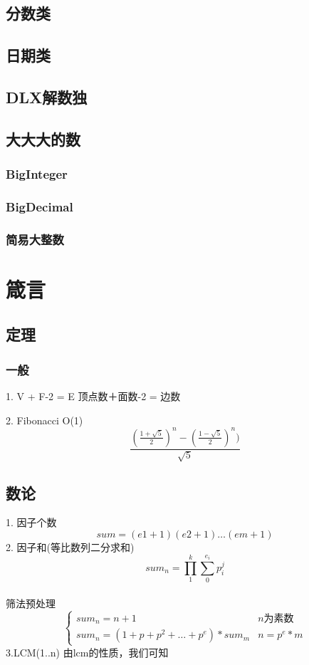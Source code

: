 \documentclass{article}
\begin{document}
\subsection{分数类}

\subsection{日期类}

\subsection{DLX解数独}

\subsection{大大大的数}
\subsubsection{BigInteger}

\subsubsection{BigDecimal}

\subsubsection{简易大整数}

\section{箴言}

\subsection{定理}
\subsubsection{一般}
1. V + F-2 = E 顶点数＋面数-2 = 边数

2. Fibonacci O(1)$$\frac{ ( \frac{1+\sqrt{5}}{2} )^n - (\frac{1-\sqrt{5}}{2})^n ) }{ \sqrt{5} }$$

\newpage
\subsection{数论}
1. 因子个数 
$$sum=(e1+1)(e2+1)…(em+1)$$
2. 因子和(等比数列二分求和)
$$sum_n=\prod_1^k \sum_0^{e_i}p_i^j$$\\
筛法预处理
$$\begin{cases} 
sum_n = n+1  &n为素数    \\ 
sum_n = (1 + p + p^2 + … + p^e)*sum_m  & n = p^e*m 
\end{cases}
$$
3.LCM(1..n)
由lcm的性质，我们可知
\end{document}
